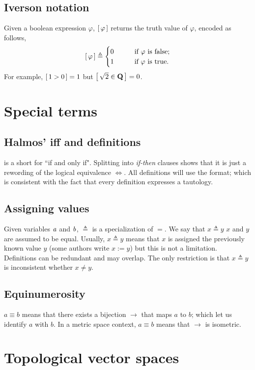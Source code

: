 \subsection{Iverson notation}%
Given a boolean expression $\varphi$, %
$\left[\,\varphi\,\right]$ returns the truth value of $\varphi$, encoded as follows, %
%
\begin{align} \nonumber
  \left[\,\varphi\,\right]\triangleq 
  \begin{cases}
    0 & \quad\quad \text{if } \varphi \text{ is false;} \\
    1 & \quad\quad \text{if } \varphi \text{ is true.}
  \end{cases}
\end{align}
%
For example, $\left[\,1 > 0\,\right] = 1$ but $\left[\, \sqrt{2} \in {\mathbf Q}\,\right] = 0$.
\section{Special terms}
\subsection{Halmos' iff and definitions}%
\iif is a short for ``if and only if". %
Splitting \iif into \textit{if-then} clauses shows that it is just %
a rewording of the logical equivalence $\Leftrightarrow$. %
All definitions will use the \iif format; %
which is consistent with the fact that every definition expresses a tautology.
%
\subsection{Assigning values}%
Given variables $\mathit{a}$ and $\mathit{b}$, $\triangleq$ is a specialization %
of $=$. We say that $x\triangleq y$ \iif $x$ and $y$ are assumed to be equal. 
Usually, $x\triangleq y$ means that $x$ is assigned the previously known 
value $y$ (some authors write $x:=y$) but this is not a limitation. 
Definitions can be redundant and may overlap. The only restriction is that %
$x\triangleq y$ is inconsistent whether $x\neq y$.

\subsection{Equinumerosity}%
$a\equiv b$ means that there exists a bijection $\to$ that maps $a$ to $b$; %
which let us identify $a$ with $b$. %
In a metric space context, $a\equiv b$ means that $\to$ is isometric.
\section{Topological vector spaces}
